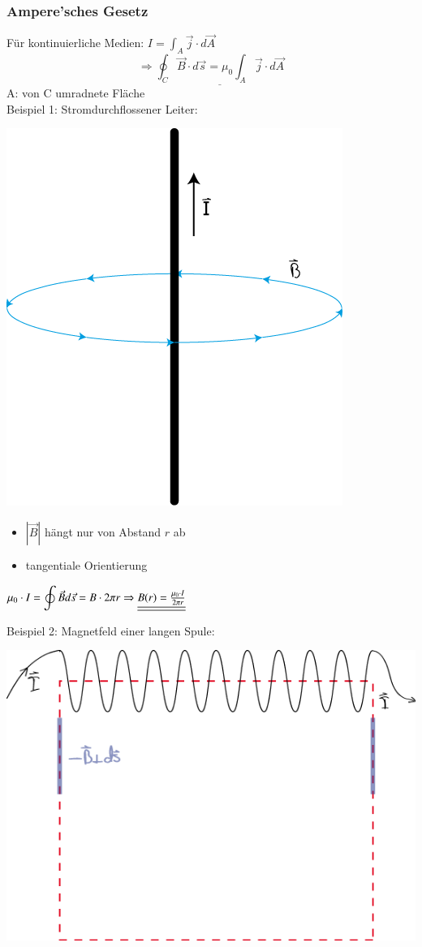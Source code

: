 \subsubsection{Ampere'sches Gesetz}
Für kontinuierliche Medien: $ I = {\displaystyle \int_A \vec{j}\cdot d\vec{A}} $\\
$$ \Rightarrow\underline{{\displaystyle\oint_C \vec{B}\cdot d\vec{s} = \mu_0\int_A \vec{j} \cdot d\vec{A}}} $$
A: von C umradnete Fläche\\
\break
Beispiel 1: Stromdurchflossener Leiter:
\begin{center}
	\includegraphics[width=0.4\linewidth]{skizzen/16/16_2B09}
\end{center}
\begin{itemize}
	\item $ |\vec{B}| $ hängt nur von Abstand $ r $ ab
	\item tangentiale Orientierung
\end{itemize}
\begin{math}
\mu_0 \cdot I = {\displaystyle\oint\vec{B}d\vec{s}} = B \cdot 2\pi r\\
\Rightarrow \underline{\underline{B(r) = \frac{\mu_0 \cdot I }{2\pi r}}}
\end{math}

\noindent Beispiel 2: Magnetfeld einer langen Spule:
\begin{center}
	\includegraphics[width=0.6\linewidth]{skizzen/16/16_2B10}
\end{center}

